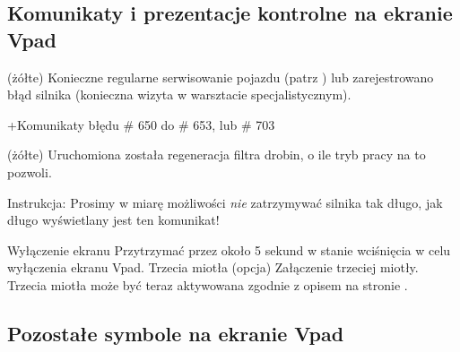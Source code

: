 \setupparagraphs [SymVpad][1][width=4em,inner=\hfill]


\subsection{Komunikaty i prezentacje kontrolne na ekranie Vpad} %


\startSymVpad
\externalfigure[vpadWarningService][height=1.7\lH]
\SymVpad
{}(żółte) Konieczne regularne serwisowanie pojazdu (patrz  ) lub zarejestrowano błąd silnika (konieczna wizyta w warsztacie specjalistycznym).

+\:Komunikaty błędu \# 650 do \# 653, lub \# 703
\stopSymVpad


\startSymVpad
\externalfigure[vpadTDPF][height=1.7\lH]
\SymVpad
{}(żółte) Uruchomiona została regeneracja filtra drobin, o ile tryb pracy na to pozwoli.

{\md Instrukcja:} {\lt Prosimy w miarę możliwości {\em nie} zatrzymywać silnika tak długo, jak długo wyświetlany jest ten komunikat!}
\stopSymVpad





\bTR\bTD {} \eTD\bTD Wyłączenie ekranu \eTD\bTD Przytrzymać przez około 5 sekund w stanie wciśnięcia w celu wyłączenia ekranu Vpad. \eTD\eTR
\bTR\bTD {}
\eTD\bTD Trzecia miotła (opcja) \eTD\bTD Załączenie trzeciej miotły.
Trzecia miotła może być teraz aktywowana zgodnie z opisem na stronie . \eTD\eTR



\startsection [title={Menu Vpad}, reference={vpad:menu}]



\subsection{Pozostałe symbole na ekranie Vpad}




